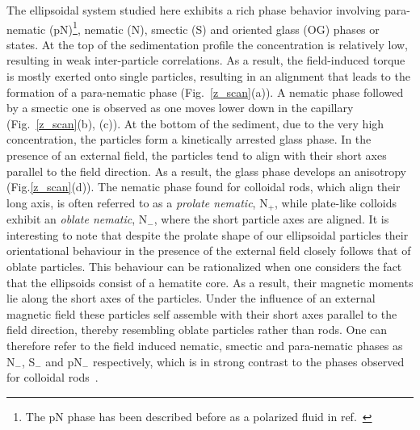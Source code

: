 \documentclass[aps,prl,preprint,superscriptaddress,showkeys]{revtex4-2} %
\begin{document}
The ellipsoidal system studied here exhibits a rich phase behavior involving para-nematic (pN)\footnote{The pN phase has been described before as a polarized fluid in ref.~\cite{martchenko2016anisotropic}}, nematic (N), smectic (S) and oriented glass (OG) phases or states. At the top of the sedimentation profile the concentration is relatively low, resulting in weak inter-particle correlations. As a result, the field-induced torque is mostly exerted onto single particles, resulting in an alignment that leads to the formation of a para-nematic phase (Fig.~\ref{z_scan}(a)). A nematic phase followed by a smectic one is observed as one moves lower down in the capillary (Fig.~\ref{z_scan}(b), (c)). At the bottom of the sediment, due to the very high concentration, the particles form a kinetically arrested glass phase. In the presence of an external field, the particles tend to align with their short axes parallel to the field direction. As a result, the glass phase develops an anisotropy (Fig.\ref{z_scan}(d)). The nematic phase found for colloidal rods, which align their long axis, is often referred to as a \emph{prolate nematic}, N$_+$, while plate-like colloids exhibit an \emph{oblate nematic}, N$_-$, where the short particle axes are aligned. It is interesting to note that despite the prolate shape of our ellipsoidal particles their orientational behaviour in the presence of the external field closely follows that of oblate particles. This behaviour can be rationalized when one considers the fact that the ellipsoids consist of a hematite core. As a result, their magnetic moments lie along the short axes of the particles. Under the influence of an external magnetic field these particles self assemble with their short axes parallel to the field direction, thereby resembling oblate particles rather than rods. One can therefore refer to the field induced nematic, smectic and para-nematic phases as N$_-$, S$_-$ and pN$_-$ respectively, which is in strong contrast to the phases observed for colloidal rods~\cite{kuijk2011synthesis}. \par
\end{document}
